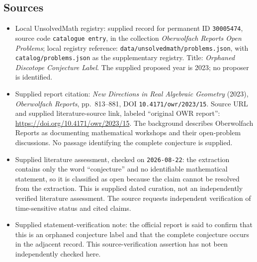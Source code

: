 \documentclass[11pt]{article}
\begin{document}
\subsection{Sources}
\begin{itemize}
\item Local UnsolvedMath registry: supplied record for permanent ID \texttt{30005474}, source code \texttt{catalogue entry}, in the collection \emph{Oberwolfach Reports Open Problems}; local registry reference: \texttt{data/unsolvedmath/problems.json}, with \texttt{catalog/problems.json} as the supplementary registry. Title: \emph{Orphaned Discotope Conjecture Label}. The supplied proposed year is 2023; no proposer is identified.
\item Supplied report citation: \emph{New Directions in Real Algebraic Geometry} (2023), \emph{Oberwolfach Reports}, pp.~813--881, DOI \texttt{10.4171/owr/2023/15}. Source URL and supplied literature-source link, labeled ``original OWR report'': \url{https://doi.org/10.4171/owr/2023/15}. The background describes Oberwolfach Reports as documenting mathematical workshops and their open-problem discussions. No passage identifying the complete conjecture is supplied.
\item Supplied literature assessment, checked on \texttt{2026-08-22}: the extraction contains only the word ``conjecture'' and no identifiable mathematical statement, so it is classified as open because the claim cannot be resolved from the extraction. This is supplied dated curation, not an independently verified literature assessment. The source requests independent verification of time-sensitive status and cited claims.
\item Supplied statement-verification note: the official report is said to confirm that this is an orphaned conjecture label and that the complete conjecture occurs in the adjacent record. This source-verification assertion has not been independently checked here.
\end{itemize}
\end{document}
